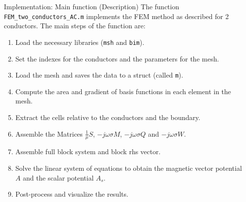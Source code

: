 \documentclass[aspectratio=54,xcolor=dvipsnames]{beamer}
\begin{document}
\begin{frame}{Implementation: Main function (Description)}
    The function \texttt{FEM\_two\_conductors\_AC.m} implements the FEM method as described for 2 conductors. The main steps of the function are:
    \begin{enumerate}
        \item Load the necessary libraries (\texttt{msh} and \texttt{bim}).
        \item Set the indexes for the conductors and the parameters for the mesh.
        \item Load the mesh and saves the data to a struct (called \texttt{m}).
        \item Compute the area and gradient of basis functions in each element in the mesh.
        \item Extract the cells relative to the conductors and the boundary.
        \item Assemble the Matrices $\frac{1}{\mu}S$, $-j \omega \sigma M$, $-j \omega \sigma Q$ and $-j \omega \sigma W$.
        \item Assemble full block system and block rhs vector.
        \item Solve the linear system of equations to obtain the magnetic vector potential $A$ and the scalar potential $A_s$.
        \item Post-process and visualize the results.
    \end{enumerate} 
\end{frame}
\end{document}
